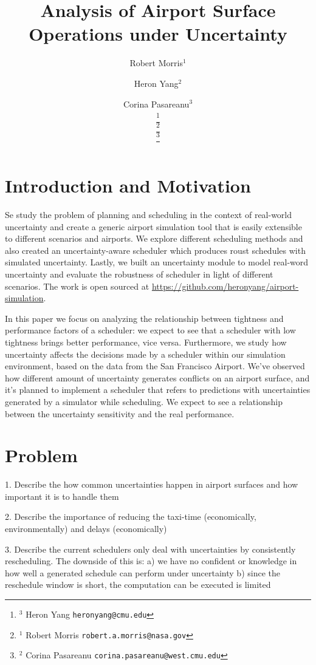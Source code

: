 \documentclass[letterpaper, 10 pt, conference]{ieeeconf}
\title{Analysis of Airport Surface Operations under Uncertainty}
\author{Robert Morris$^{1}$ \and Heron Yang$^{2}$  \and Corina Pasareanu$^{3}$ \\ %
\thanks{$^{3}$ Heron Yang {\tt\small heronyang@cmu.edu}} \\
\thanks{$^{1}$ Robert Morris {\tt\small robert.a.morris@nasa.gov}} \\%
\thanks{$^{2}$ Corina Pasareanu {\tt\small corina.pasareanu@west.cmu.edu}}%
}
\begin{document}
\maketitle
\begin{abstract}
\end{abstract}
\section{Introduction and Motivation}

Se study the problem of planning and scheduling in the context of real-world uncertainty and create a generic airport simulation tool that is easily extensible to different scenarios and airports. We explore different scheduling methods and also created an uncertainty-aware scheduler which produces roust schedules with simulated uncertainty. Lastly, we built an uncertainty module to model real-word uncertainty and evaluate the robustness of scheduler in light of different scenarios. The work is open sourced at \url{https://github.com/heronyang/airport-simulation}.

In this paper we focus on analyzing the relationship between tightness and performance factors of a scheduler: we expect to see that a scheduler with low tightness brings better performance, vice versa. Furthermore, we study how uncertainty affects the decisions made by a scheduler within our simulation environment, based on the data from the San Francisco Airport. We've observed how different amount of uncertainty generates conflicts on an airport surface, and it's planned to implement a scheduler that refers to predictions with uncertainties generated by a simulator while scheduling. We expect to see a relationship between the uncertainty sensitivity and the real performance.

\section{Problem}

1. Describe the how common uncertainties happen in airport surfaces and how important it is to handle them

2. Describe the importance of reducing the taxi-time (economically, environmentally) and delays (economically)

3. Describe the current schedulers only deal with uncertainties by consistently rescheduling. The downside of this is: a) we have no confident or knowledge in how well a generated schedule can perform under uncertainty b) since the reschedule window is short, the computation can be executed is limited
\end{document}
